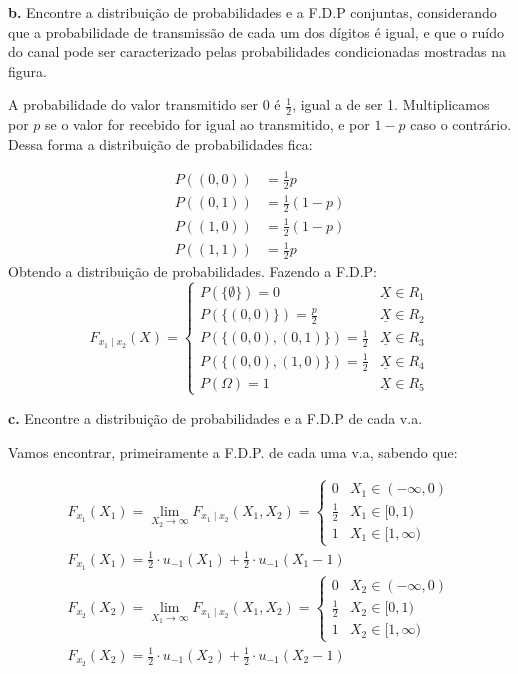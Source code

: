 \documentclass[a5paper]{report}
\begin{document}
\textbf{b.} Encontre a distribuição de probabilidades e a F.D.P conjuntas, considerando que a probabilidade de transmissão de cada um dos dígitos é igual, e que o ruído do canal pode ser caracterizado pelas probabilidades condicionadas mostradas na figura.

A probabilidade do valor transmitido ser 0 é $\frac{1}{2}$, igual a de ser 1. Multiplicamos por $p$ se o valor for recebido for igual ao transmitido, e por $1 - p$ caso o contrário. Dessa forma a distribuição de probabilidades fica:

\begin{align*}
	P((0, 0)) &= \frac{1}{2} p\\
	P((0, 1)) &= \frac{1}{2} (1 - p)\\
	P((1, 0)) &= \frac{1}{2} (1 - p)\\
	P((1, 1)) &= \frac{1}{2} p
\end{align*}
Obtendo a distribuição de probabilidades. Fazendo a F.D.P:
\begin{equation*}
	F_{x_1 \mid x_2}(X) =
	\begin{cases}
		P(\{ \emptyset \}) = 0							& \underline{X} \in R_1\\
		P(\{(0, 0)\}) = \frac{p}{2} 					& \underline{X} \in R_2\\
		P(\{(0, 0), (0, 1)\}) = \frac{1}{2}				& \underline{X} \in R_3\\
		P(\{(0, 0), (1, 0)\}) = \frac{1}{2}				& \underline{X} \in R_4\\
		P(\Omega) = 1									& \underline{X} \in R_5
	\end{cases}
\end{equation*}

\textbf{c.} Encontre a distribuição de probabilidades e a F.D.P de cada v.a.

Vamos encontrar, primeiramente a F.D.P. de cada uma v.a, sabendo que:

\begin{align*}
	F_{x_1}(X_1) = \lim_{X_2 \to \infty} F_{x_1 \mid x_2}(X_1, X_2) = 
	\begin{cases}
		0 				& X_1 \in (-\infty, 0)\\
		\frac{1}{2}		& X_1 \in [0, 1)\\
		1				& X_1 \in [1, \infty)
	\end{cases}\\
	F_{x_1}(X_1) = \frac{1}{2} \cdot u_{-1}(X_1) + \frac{1}{2} \cdot u_{-1}(X_1 - 1)\\
	F_{x_2}(X_2) = \lim_{X_1 \to \infty} F_{x_1 \mid x_2}(X_1, X_2) = 
	\begin{cases}
		0 				& X_2 \in (-\infty, 0)\\
		\frac{1}{2}		& X_2 \in [0, 1)\\
		1				& X_2 \in [1, \infty)
	\end{cases}\\
	F_{x_2}(X_2) = \frac{1}{2} \cdot u_{-1}(X_2) + \frac{1}{2} \cdot u_{-1}(X_2 - 1)
\end{align*}
\end{document}

